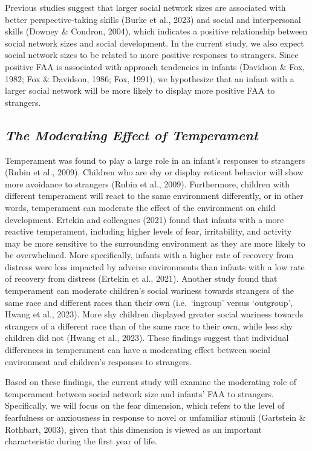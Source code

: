 \documentclass[
  man,
  floatsintext,
  longtable,
  nolmodern,
  notxfonts,
  notimes,
  colorlinks=true,linkcolor=blue,citecolor=blue,urlcolor=blue]{apa7}
\begin{document}
Previous studies suggest that larger social network sizes are associated
with better perspective-taking skills (Burke et al., 2023) and social
and interpersonal skills (Downey \& Condron, 2004), which indicates a
positive relationship between social network sizes and social
development. In the current study, we also expect social network sizes
to be related to more positive responses to strangers. Since positive
FAA is associated with approach tendencies in infants (Davidson \& Fox,
1982; Fox \& Davidson, 1986; Fox, 1991), we hypothesize that an infant
with a larger social network will be more likely to display more
positive FAA to strangers.

\subsection{\texorpdfstring{\emph{The Moderating Effect of
Temperament}}{The Moderating Effect of Temperament}}\label{the-moderating-effect-of-temperament}

Temperament was found to play a large role in an infant's responses to
strangers (Rubin et al., 2009). Children who are shy or display reticent
behavior will show more avoidance to strangers (Rubin et al., 2009).
Furthermore, children with different temperament will react to the same
environment differently, or in other words, temperament can moderate the
effect of the environment on child development. Ertekin and colleagues
(2021) found that infants with a more reactive temperament, including
higher levels of fear, irritability, and activity may be more sensitive
to the surrounding environment as they are more likely to be
overwhelmed. More specifically, infants with a higher rate of recovery
from distress were less impacted by adverse environments than infants
with a low rate of recovery from distress (Ertekin et al., 2021).
Another study found that temperament can moderate children's social
wariness towards strangers of the same race and different races than
their own (i.e.~`ingroup' versus `outgroup', Hwang et al., 2023). More
shy children displayed greater social wariness towards strangers of a
different race than of the same race to their own, while less shy
children did not (Hwang et al., 2023). These findings suggest that
individual differences in temperament can have a moderating effect
between social environment and children's responses to strangers.

Based on these findings, the current study will examine the moderating
role of temperament between social network size and infants' FAA to
strangers. Specifically, we will focus on the fear dimension, which
refers to the level of fearfulness or anxiousness in response to novel
or unfamiliar stimuli (Gartstein \& Rothbart, 2003), given that this
dimension is viewed as an important characteristic during the first year
of life.
\end{document}
